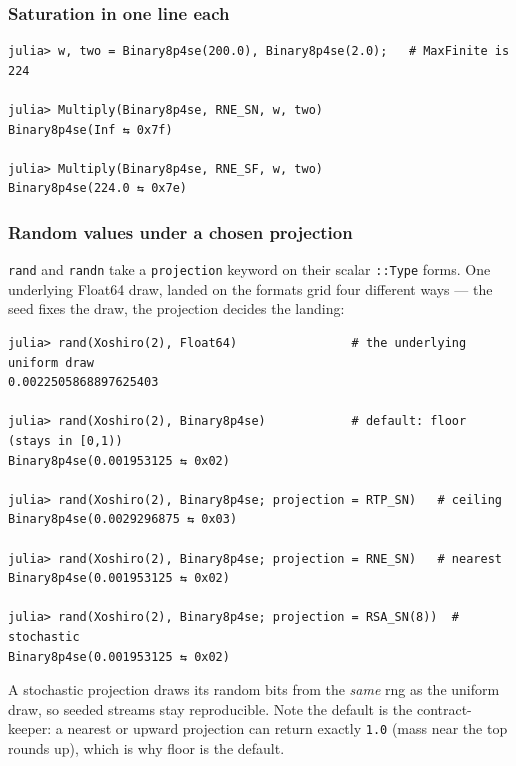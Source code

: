 \subsubsection{Saturation in one line each}



\label{18285742174011812433}{}



\begin{verbatim}
julia> w, two = Binary8p4se(200.0), Binary8p4se(2.0);   # MaxFinite is 224

julia> Multiply(Binary8p4se, RNE_SN, w, two)
Binary8p4se(Inf ⇆ 0x7f)

julia> Multiply(Binary8p4se, RNE_SF, w, two)
Binary8p4se(224.0 ⇆ 0x7e)
\end{verbatim}



\subsubsection{Random values under a chosen projection}



\label{10520373459060902538}{}


\texttt{rand} and \texttt{randn} take a \texttt{projection} keyword on their scalar \texttt{::Type} forms. One underlying Float64 draw, landed on the format{\textquotesingle}s grid four different ways — the seed fixes the draw, the projection decides the landing:




\nopagebreak[4]
\begin{verbatim}
julia> rand(Xoshiro(2), Float64)                # the underlying uniform draw
0.0022505868897625403

julia> rand(Xoshiro(2), Binary8p4se)            # default: floor (stays in [0,1))
Binary8p4se(0.001953125 ⇆ 0x02)

julia> rand(Xoshiro(2), Binary8p4se; projection = RTP_SN)   # ceiling
Binary8p4se(0.0029296875 ⇆ 0x03)

julia> rand(Xoshiro(2), Binary8p4se; projection = RNE_SN)   # nearest
Binary8p4se(0.001953125 ⇆ 0x02)

julia> rand(Xoshiro(2), Binary8p4se; projection = RSA_SN(8))  # stochastic
Binary8p4se(0.001953125 ⇆ 0x02)
\end{verbatim}



A stochastic projection draws its random bits from the \emph{same} rng as the uniform draw, so seeded streams stay reproducible. Note the default is the contract-keeper: a nearest or upward projection can return exactly \texttt{1.0} (mass near the top rounds up), which is why floor is the default.



